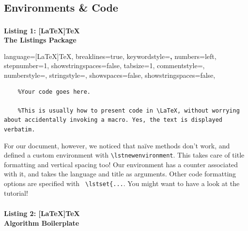 \documentclass[10pt, Computer Modern]{article}
\begin{document}
	\subsection{Environments \& Code}

	
\subsubsection*{}
	\label{list:1}
	\begin{center}
		\textbf{\large Listing 1: [LaTeX]TeX}
		\\
		\textbf{\small The Listings Package}

	\end{center}


	{
	\lstset
	{
    language=[LaTeX]TeX,
    breaklines=true,
    keywordstyle=\color{blue}\textbf,
    numbers=left,
    stepnumber=1,
    showstringspaces=false,
    tabsize=1,
    commentstyle=\color{DarkGreen},
    numberstyle=\tiny\color{gray},
    stringstyle=\color{Maroon},
    showspaces=false,                
    showstringspaces=false,
	}
	} 
	{
	}
	
	\raggedright
	\begin{case}
	\begin{lstlisting}
	%Your code goes here.

	%This is usually how to present code in \LaTeX, without worrying about accidentally invoking a macro. Yes, the text is displayed verbatim.
	\end{lstlisting}
	\label{trickq}
	\end{case}



	For our document, however, we noticed that na\"ive methods don’t work, and defined a custom environment with \lstinline{\lstnewenvironment}. This takes care of title formatting and vertical spacing too! Our environment has a counter associated with it, and takes the language and title as arguments. Other code formatting options are specified with \lstinline{ \lstset{...}. You might want to have a look at the tutorial!


\clearpage
\subsubsection*{}
	\label{list:2}
	\begin{center}
		\textbf{\large Listing 2: [LaTeX]TeX}
		\\
		\textbf{\small Algorithm Boilerplate}

	\end{center}
\end{document}
